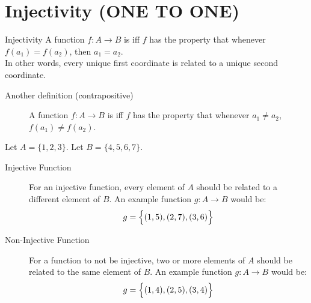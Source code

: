 \documentclass[\main/notes.tex]{subfiles}
\begin{document}
		\section[Injectivity]{Injectivity (ONE TO ONE)}
			\begin{definition}{Injectivity}
				A function $f: A \rightarrow B$ is  iff $f$ has the property that whenever $f(a_{1}) = f(a_{2})$, then $a_{1} = a_{2}$.\\
				In other words, every unique first coordinate is related to a unique second coordinate.
				\begin{description}
					\item[Another definition (contrapositive)] A function $f: A \rightarrow B$ is  iff $f$ has the property that whenever $a_{1} \neq a_{2}$, $f(a_{1}) \neq f(a_{2})$.
				\end{description}
			\end{definition}
			\begin{example}
				Let $A = \{1, 2, 3\}$. Let $B = \{4, 5, 6, 7\}$.
				\begin{description}
					\item[Injective Function] For an injective function, every element of $A$ should be related to a different element of $B$. An example function $g: A \rightarrow B$ would be:
						\begin{align*}
							g = \Bigl\{(1, 5), (2, 7), (3, 6)\Bigr\}
						\end{align*}
					\item[Non-Injective Function] For a function to not be injective, two or more elements of $A$ should be related to the same element of $B$. An example function $g: A \rightarrow B$ would be:
						\begin{align*}
							g = \Bigl\{(1, 4), (2, 5), (3, 4)\Bigr\}
						\end{align*}
				\end{description}
			\end{example}
\end{document}
